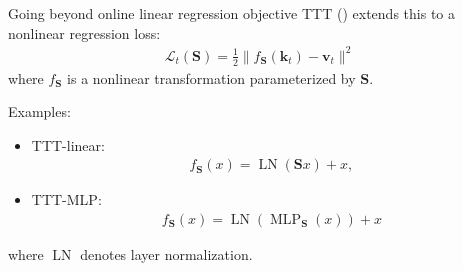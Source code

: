   \begin{frame}{Going beyond online linear regression objective}
    TTT (\cite{sun2024learning}) extends this to a nonlinear regression loss:
    \begin{align*}
      \mathcal{L}_t(\mathbf{S}) = \frac{1}{2}\|f_{\mathbf{S}}(\mathbf{k}_t) - \mathbf{v}_t\|^2
    \end{align*}
    where $f_{\mathbf{S}}$ is a nonlinear transformation parameterized by $\mathbf{S}$.

    Examples:
    \begin{itemize}
        \item TTT-linear: 
            \begin{align*}
                f_{\mathbf{S}}(x) = \operatorname{LN}(\mathbf{S}x) + x,
            \end{align*}
        \item TTT-MLP:
            \begin{align*}
                f_{\mathbf{S}}(x) = \operatorname{LN}(\operatorname{MLP}_{\mathbf{S}}(x)) + x
            \end{align*}
    \end{itemize}

    where $\operatorname{LN}$ denotes layer normalization.

    
    
  \end{frame}
